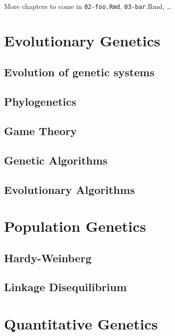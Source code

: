 \documentclass[12pt,]{krantz}
\begin{document}
More chapters to come in \texttt{02-foo.Rmd}, \texttt{03-bar}.Rmd,
\ldots{}

\chapter{Evolutionary Genetics}\label{evolutionary-genetics}

\section{Evolution of genetic
systems}\label{evolution-of-genetic-systems}

\section{Phylogenetics}\label{phylogenetics}

\section{Game Theory}\label{game-theory}

\section{Genetic Algorithms}\label{genetic-algorithms}

\section{Evolutionary Algorithms}\label{evolutionary-algorithms}

\chapter{Population Genetics}\label{population-genetics}

\section{Hardy-Weinberg}\label{hardy-weinberg}

\section{Linkage Disequilibrium}\label{linkage-disequilibrium}

\chapter{Quantitative Genetics}\label{quantitative-genetics}
\end{document}
